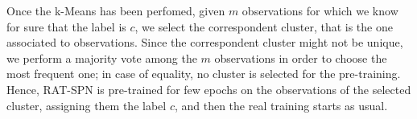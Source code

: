Once the k-Means has been perfomed, given $m$ observations for which we know for sure that the label is $c$, we select the correspondent cluster, that is the one associated to observations. Since the correspondent cluster might not be unique, we perform a majority vote among the $m$ observations in order to choose the most frequent one; in case of equality, no cluster is selected for the pre-training. Hence, RAT-SPN is pre-trained for few epochs on the observations of the selected cluster, assigning them the label $c$, and then the real training starts as usual.